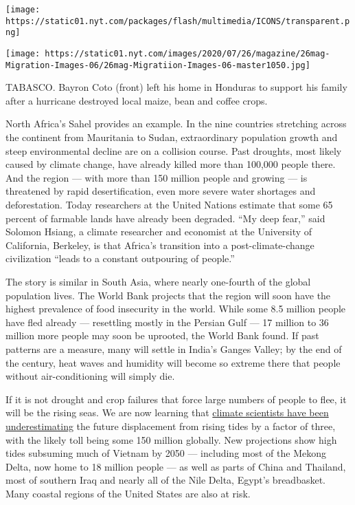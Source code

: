 \texttt{[image: https://static01.nyt.com/packages/flash/multimedia/ICONS/transparent.png]}

\texttt{[image: https://static01.nyt.com/images/2020/07/26/magazine/26mag-Migration-Images-06/26mag-Migratiion-Images-06-master1050.jpg]}

TABASCO. Bayron Coto (front) left his home in Honduras to support his
family after a hurricane destroyed local maize, bean and coffee crops.

North Africa's Sahel provides an example. In the nine countries
stretching across the continent from Mauritania to Sudan, extraordinary
population growth and steep environmental decline are on a collision
course. Past droughts, most likely caused by climate change, have
already killed more than 100,000 people there. And the region --- with
more than 150 million people and growing --- is threatened by rapid
desertification, even more severe water shortages and deforestation.
Today researchers at the United Nations estimate that some 65 percent of
farmable lands have already been degraded. ``My deep fear,'' said
Solomon Hsiang, a climate researcher and economist at the University of
California, Berkeley, is that Africa's transition into a
post-climate-change civilization ``leads to a constant outpouring of
people.''

The story is similar in South Asia, where nearly one-fourth of the
global population lives. The World Bank projects that the region will
soon have the highest prevalence of food insecurity in the world. While
some 8.5 million people have fled already --- resettling mostly in the
Persian Gulf --- 17 million to 36 million more people may soon be
uprooted, the World Bank found. If past patterns are a measure, many
will settle in India's Ganges Valley; by the end of the century, heat
waves and humidity will become so extreme there that people without
air-conditioning will simply die.

If it is not drought and crop failures that force large numbers of
people to flee, it will be the rising seas. We are now learning that
\href{https://www.nature.com/articles/s41467-019-12808-z}{climate
scientists have been underestimating} the future displacement from
rising tides by a factor of three, with the likely toll being some 150
million globally. New projections show high tides subsuming much of
Vietnam by 2050 --- including most of the Mekong Delta, now home to 18
million people --- as well as parts of China and Thailand, most of
southern Iraq and nearly all of the Nile Delta, Egypt's breadbasket.
Many coastal regions of the United States are also at risk.

